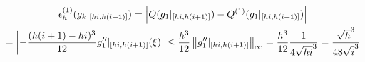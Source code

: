 \begin{multline*}
    \epsilon_h^{(1)}(g_k|_{[hi, h(i+1)]})
    =   \vbraces
        {
            Q(g_1|_{[hi, h(i+1)]}) -
            Q^{(1)}(g_1|_{[hi, h(i+1)]})
        } \\
    =   \vbraces
        {
            - \frac{(h(i+1) - hi)^3}{12}
            g_1''|_{[hi, h(i+1)]}(\xi)
        }
      \leq
        \frac{h^3}{12}
        \norm[\infty]{g_1''|_{[hi, h(i+1)]}}
    =   \frac{h^3}{12}
        \frac{1}{4 \sqrt{hi}^3}
    =   \frac{\sqrt{h}^3}{48 \sqrt{i}^3}
\end{multline*}